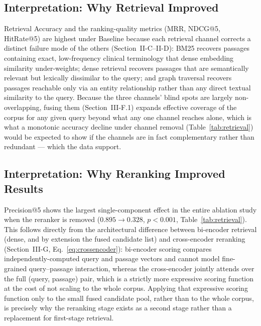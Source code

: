\documentclass[conference]{IEEEtran}
\begin{document}
\subsection{Interpretation: Why Retrieval Improved}
Retrieval Accuracy and the ranking-quality metrics (MRR, NDCG@5, HitRate@5) are highest under Baseline because each retrieval channel corrects a distinct failure mode of the others (Section~II-C--II-D): BM25 recovers passages containing exact, low-frequency clinical terminology that dense embedding similarity under-weights; dense retrieval recovers passages that are semantically relevant but lexically dissimilar to the query; and graph traversal recovers passages reachable only via an entity relationship rather than any direct textual similarity to the query. Because the three channels' blind spots are largely non-overlapping, fusing them (Section~III-F.1) expands effective coverage of the corpus for any given query beyond what any one channel reaches alone, which is what a monotonic accuracy decline under channel removal (Table~\ref{tab:retrieval}) would be expected to show if the channels are in fact complementary rather than redundant --- which the data support.

\subsection{Interpretation: Why Reranking Improved Results}
Precision@5 shows the largest single-component effect in the entire ablation study when the reranker is removed ($0.895 \rightarrow 0.328$, $p<0.001$, Table~\ref{tab:retrieval}). This follows directly from the architectural difference between bi-encoder retrieval (dense, and by extension the fused candidate list) and cross-encoder reranking (Section~III-G, Eq.~\ref{eq:crossencoder}): bi-encoder scoring compares independently-computed query and passage vectors and cannot model fine-grained query--passage interaction, whereas the cross-encoder jointly attends over the full (query, passage) pair, which is a strictly more expressive scoring function at the cost of not scaling to the whole corpus. Applying that expressive scoring function only to the small fused candidate pool, rather than to the whole corpus, is precisely why the reranking stage exists as a second stage rather than a replacement for first-stage retrieval.
\end{document}
